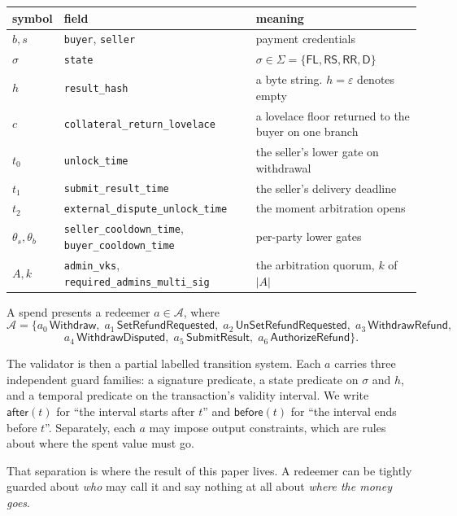 \documentclass[11pt]{article}
\theoremstyle{remark}
\newcommand{\FL}{\mathsf{FL}}
\newcommand{\RS}{\mathsf{RS}}
\newcommand{\RR}{\mathsf{RR}}
\newcommand{\Dd}{\mathsf{D}}
\newcommand{\afterr}{\mathsf{after}}
\newcommand{\before}{\mathsf{before}}
\begin{document}
\begin{center}
\small
\begin{tabular}{@{}lp{5.0cm}p{6.4cm}@{}}
\toprule
symbol & field & meaning \\
\midrule
$b, s$ & \texttt{buyer}, \texttt{seller} & payment credentials \\
$\sigma$ & \texttt{state} & $\sigma \in \Sigma = \{\FL, \RS, \RR, \Dd\}$ \\
$h$ & \texttt{result\_hash} & a byte string. $h = \varepsilon$ denotes empty \\
$c$ & \texttt{collateral\_return\_lovelace} & a lovelace floor returned to the buyer on one branch \\
$t_0$ & \texttt{unlock\_time} & the seller's lower gate on withdrawal \\
$t_1$ & \texttt{submit\_result\_time} & the seller's delivery deadline \\
$t_2$ & \texttt{external\_dispute\_unlock\_time} & the moment arbitration opens \\
$\theta_s, \theta_b$ & \texttt{seller\_cooldown\_time}, \texttt{buyer\_cooldown\_time} & per-party lower gates \\
$A, k$ & \texttt{admin\_vks}, \texttt{required\_admins\_multi\_sig} & the arbitration quorum, $k$ of $|A|$ \\
\bottomrule
\end{tabular}
\end{center}

\noindent A spend presents a redeemer $a \in \mathcal{A}$, where
\[
\mathcal{A} = \{a_0\,\mathsf{Withdraw},\; a_1\,\mathsf{SetRefundRequested},\; a_2\,\mathsf{UnSetRefundRequested},\;
a_3\,\mathsf{WithdrawRefund},
\]
\[
a_4\,\mathsf{WithdrawDisputed},\; a_5\,\mathsf{SubmitResult},\; a_6\,\mathsf{AuthorizeRefund}\}.
\]

The validator is then a partial labelled transition system. Each $a$ carries three independent guard families: a
signature predicate, a state predicate on $\sigma$ and $h$, and a temporal predicate on the transaction's validity
interval. We write $\afterr(t)$ for ``the interval starts after $t$'' and $\before(t)$ for ``the interval ends before
$t$''. Separately, each $a$ may impose output constraints, which are rules about where the spent value must go.

That separation is where the result of this paper lives. A redeemer can be tightly guarded about \emph{who} may call
it and say nothing at all about \emph{where the money goes}.
\end{document}
